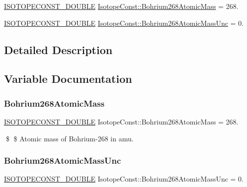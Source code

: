 \begin{DoxyCompactItemize}
\item 
\mbox{\hyperlink{group___isotope_const-_macros_ga8f45a7272ce02c0b4c65c44636ed719a}{I\+S\+O\+T\+O\+P\+E\+C\+O\+N\+S\+T\+\_\+\+D\+O\+U\+B\+LE}} \mbox{\hyperlink{group___isotope_const-_bohrium-_bh268_gaad6ed9a5a3cd0edb8b311b9c020fede1}{Isotope\+Const\+::\+Bohrium268\+Atomic\+Mass}} = 268.
\item 
\mbox{\hyperlink{group___isotope_const-_macros_ga8f45a7272ce02c0b4c65c44636ed719a}{I\+S\+O\+T\+O\+P\+E\+C\+O\+N\+S\+T\+\_\+\+D\+O\+U\+B\+LE}} \mbox{\hyperlink{group___isotope_const-_bohrium-_bh268_gabb1cb8058e872a11fd1f68235f6639fe}{Isotope\+Const\+::\+Bohrium268\+Atomic\+Mass\+Unc}} = 0.
\end{DoxyCompactItemize}


\subsection{Detailed Description}


\subsection{Variable Documentation}
\mbox{\label{group___isotope_const-_bohrium-_bh268_gaad6ed9a5a3cd0edb8b311b9c020fede1}} 
\subsubsection{\texorpdfstring{Bohrium268\+Atomic\+Mass}{Bohrium268AtomicMass}}
{\footnotesize\ttfamily \mbox{\hyperlink{group___isotope_const-_macros_ga8f45a7272ce02c0b4c65c44636ed719a}{I\+S\+O\+T\+O\+P\+E\+C\+O\+N\+S\+T\+\_\+\+D\+O\+U\+B\+LE}} Isotope\+Const\+::\+Bohrium268\+Atomic\+Mass = 268.}

\$ \$ Atomic mass of Bohrium-\/268 in amu. \mbox{\label{group___isotope_const-_bohrium-_bh268_gabb1cb8058e872a11fd1f68235f6639fe}} 
\subsubsection{\texorpdfstring{Bohrium268\+Atomic\+Mass\+Unc}{Bohrium268AtomicMassUnc}}
{\footnotesize\ttfamily \mbox{\hyperlink{group___isotope_const-_macros_ga8f45a7272ce02c0b4c65c44636ed719a}{I\+S\+O\+T\+O\+P\+E\+C\+O\+N\+S\+T\+\_\+\+D\+O\+U\+B\+LE}} Isotope\+Const\+::\+Bohrium268\+Atomic\+Mass\+Unc = 0.}

